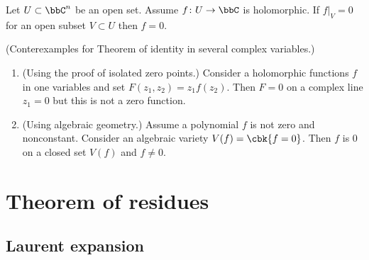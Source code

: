 \documentclass[openany, a4paper, oneside]{jsbook}
\begin{document}
\begin{thm}
 Let $U \subset \bbC^n$ be an open set.
 Assume $f \colon U \to \bbC$ is holomorphic.
 If $f|_V = 0$ for an open subset $V \subset U$ then $f=0$.
\end{thm}
\begin{ex}\textup{(Conterexamples for Theorem of identity in several complex variables.)}
\begin{enumerate}
\item \textup{(Using the proof of isolated zero points.)} Consider a holomorphic functions $f$ in one variables and set $F (z_1, z_2) = z_1 f (z_2)$.
Then $F = 0$ on a complex line $z_1 = 0$ but this is not a zero function.
\item \textup{(Using algebraic geometry.)} Assume a polynomial $f$ is not zero and nonconstant.
Consider an algebraic variety $V (f) = \cbk{f=0}$.
Then $f$ is $0$ on a closed set $V (f)$ and $f \neq 0$.
\end{enumerate}
\end{ex}
\section{Theorem of residues}

\subsection{Laurent expansion}
\end{document}
